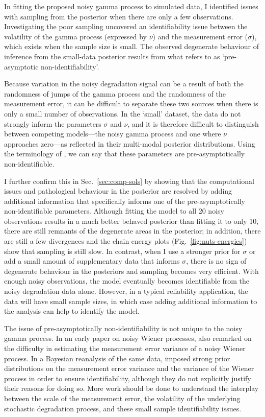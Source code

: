 In fitting the proposed noisy gamma process to simulated data, I identified issues with sampling from the posterior when there are only a few observations. Investigating the poor sampling uncovered an identifiability issue between the volatility of the gamma process (expressed by $\nu$) and the measurement error ($\sigma$), which exists when the sample size is small. The observed degenerate behaviour of inference from the small-data posterior results from what \citet{betancourt_2020} refers to as `pre-asymptotic non-identifiability'.

Because variation in the noisy degradation signal can be a result of both the randomness of jumps of the gamma process and the randomness of the measurement error, it can be difficult to separate these two sources when there is only a small number of observations. In the `small' dataset, the data do not strongly inform the parameters $\sigma$ and $\nu$, and it is therefore difficult to distinguish between competing models---the noisy gamma process and one where $\nu$ approaches zero---as reflected in their multi-modal posterior distributions. Using the terminology of \citet{betancourt_2020}, we can say that these parameters are pre-asymptotically non-identifiable.

I further confirm this in Sec.~\ref{sec:comp-sols} by showing that the computational issues and pathological behaviour in the posterior are resolved by adding additional information that specifically informs one of the pre-asymptotically non-identifiable parameters. Although fitting the model to all 20 noisy observations results in a much better behaved posterior than fitting it to only 10, there are still remnants of the degenerate areas in the posterior; in addition, there are still a few divergences and the chain energy plots (Fig.~\ref{fig:nuts-energies}) show that sampling is still slow. In contrast, when I use a stronger prior for $\sigma$ or add a small amount of supplementary data that informs $\sigma$, there is no sign of degenerate behaviour in the posteriors and sampling becomes very efficient. With enough noisy observations, the model eventually becomes identifiable from the noisy degradation data alone. However, in a typical reliability application, the data will have small sample sizes, in which case adding additional information to the analysis can help to identify the model.

The issue of pre-asymptotically non-identifiability is not unique to the noisy gamma process. In an early paper on noisy Wiener processes, \citet{whitmore_1995} also remarked on the difficulty in estimating the measurement error variance of a noisy Wiener process. In a Bayesian reanalysis of the same data, \citet{hamada_2008} imposed strong prior distributions on the measurement error variance and the variance of the Wiener process in order to ensure identifiability, although they do not explicitly justify their reasons for doing so. More work should be done to understand the interplay between the scale of the measurement error, the volatility of the underlying stochastic degradation process, and these small sample identifiability issues.

